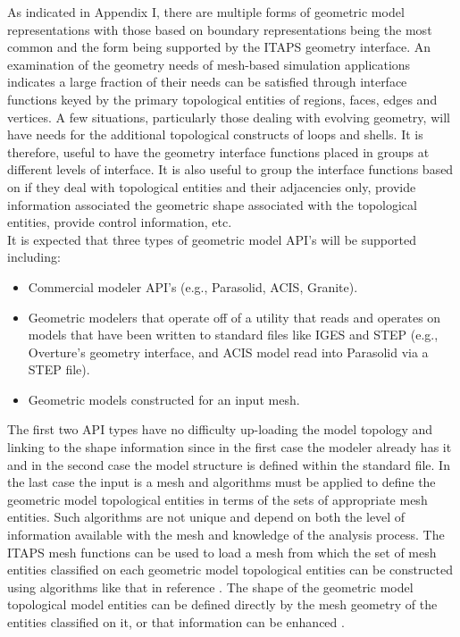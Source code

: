 \documentclass{article}
\begin{document}
As indicated in Appendix I, there are multiple forms of geometric 
model representations with those based on boundary representations 
being the most common and the form being supported by the ITAPS 
geometry interface. An examination of the geometry needs of mesh-based 
simulation applications indicates a large fraction of their needs 
can be satisfied through interface functions keyed by the primary 
topological entities of regions, faces, edges and vertices. A 
few situations, particularly those dealing with evolving geometry, 
will have needs for the additional topological constructs of 
loops and shells. It is therefore, useful to have the geometry 
interface functions placed in groups at different levels of interface. 
It is also useful to group the interface functions based on if 
they deal with topological entities and their adjacencies only, 
provide information associated the geometric shape associated 
with the topological entities, provide control information, etc.\\

It is expected that three types of geometric model API's 
will be supported including:

\begin{itemize}
\item Commercial modeler API's (e.g., Parasolid, ACIS, 
Granite).
\item Geometric modelers that operate off of a utility 
that reads and operates on models that have been written to standard 
files like IGES and STEP (e.g., Overture's geometry interface, 
and ACIS model read into Parasolid via a STEP file). 
\item Geometric models constructed for an input mesh.
\end{itemize}

The first two API types have no difficulty up-loading the 
model topology and linking to the shape information since in 
the first case the modeler already has it and in the second case 
the model structure is defined within the standard file. In the 
last case the input is a mesh and algorithms must be applied 
to define the geometric model topological entities in terms of 
the sets of appropriate mesh entities. Such algorithms are not 
unique and depend on both the level of information available 
with the mesh and knowledge of the analysis process. The ITAPS 
mesh functions can be used to load a mesh from which the set 
of mesh entities classified on each geometric model topological 
entities can be constructed using algorithms like that in reference 
\cite{r10, r19, r28}. The shape of the geometric model topological model 
entities can be defined directly by the mesh geometry of the 
entities classified on it, or that information can be enhanced 
\cite{r5, r28}.\\
\end{document}
